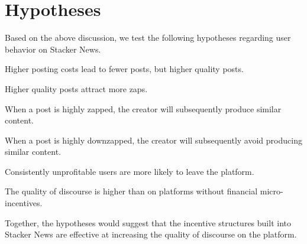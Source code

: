 \section{Hypotheses} \label{sec_hypotheses}

Based on the above discussion, we test the following hypotheses regarding user behavior on Stacker News. 

\begin{hyp}
Higher posting costs lead to fewer posts, but higher quality posts.
\end{hyp}
\begin{hyp}
Higher quality posts attract more zaps.
\end{hyp}
\begin{hyp}
When a post is highly zapped, the creator will subsequently produce similar content.
\end{hyp}
\begin{hyp}
When a post is highly downzapped, the creator will subsequently avoid producing similar content.
\end{hyp}
\begin{hyp}
Consistently unprofitable users are more likely to leave the platform.
\end{hyp}
\begin{hyp}
The quality of discourse is higher than on platforms without financial micro-incentives.
\end{hyp}

Together, the hypotheses would suggest that the incentive structures built into Stacker News are effective at increasing the quality of discourse on the platform.